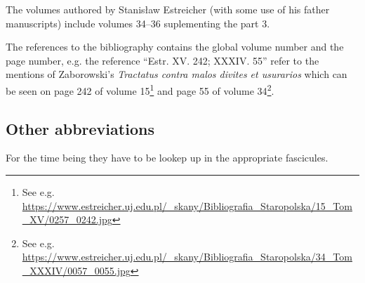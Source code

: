\documentclass[12pt]{article}
\begin{document}
  The volumes authored by Stanisław Estreicher (with some use of his
  father manuscripts) include volumes 34--36 suplementing the part 3.

  The references to the bibliography contains the global volume number
  and the page number, e.g.  the reference ``Estr. XV. 242;
  XXXIV. 55'' refer to the mentions of Zaborowski's \textit{Tractatus
    contra malos divites et usurarios} which can be seen on page 242
  of volume 15\footnote{See e.g.
    \url{https://www.estreicher.uj.edu.pl/_skany/Bibliografia_Staropolska/15_Tom_XV/0257_0242.jpg}}
  and page 55 of volume 34\footnote{See e.g.
    \url{https://www.estreicher.uj.edu.pl/_skany/Bibliografia_Staropolska/34_Tom_XXXIV/0057_0055.jpg}}.

\subsection{Other abbreviations}
\label{sec:other-abbreviations}


For the time being they have to be lookep up in the appropriate
fascicules.











\end{document}
